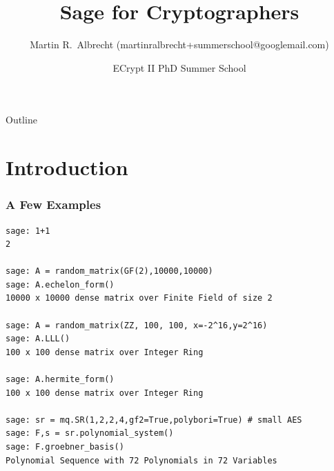 \documentclass[10pt]{beamer}
\title{Sage for Cryptographers}
\author{Martin R.\ Albrecht (martinralbrecht+summerschool@googlemail.com)}
\institute{POLSYS Team, UPMC, Paris, France}
\date{ECrypt II PhD Summer School}
\begin{document}
\begin{frame}
\titlepage
\end{frame}

\begin{frame}{Outline}
\tableofcontents
\end{frame}

\section{Introduction}

\begin{frame}[fragile]
\frametitle{A Few Examples}
\begin{lstlisting}
sage: 1+1
2

sage: A = random_matrix(GF(2),10000,10000)
sage: A.echelon_form()
10000 x 10000 dense matrix over Finite Field of size 2

sage: A = random_matrix(ZZ, 100, 100, x=-2^16,y=2^16)
sage: A.LLL()
100 x 100 dense matrix over Integer Ring

sage: A.hermite_form()
100 x 100 dense matrix over Integer Ring

sage: sr = mq.SR(1,2,2,4,gf2=True,polybori=True) # small AES
sage: F,s = sr.polynomial_system()
sage: F.groebner_basis()
Polynomial Sequence with 72 Polynomials in 72 Variables
\end{lstlisting}
\end{frame}
\end{document}
